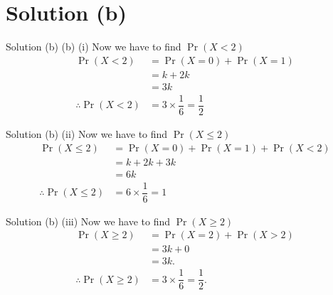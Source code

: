 \documentclass{beamer}
\providecommand{\pr}[1]{\ensuremath{\Pr\left(#1\right)}}
\begin{document}
    \section{Solution (b)}
    \begin{frame}{Solution (b)}
    (b) (i) Now we have to find $\pr{X<2}$\\
    \begin{align*}
    \pr{X<2} &= \pr{X=0} + \pr{X=1}\\
    &= k + 2k\\
    &= 3k\\
    \therefore \pr{X<2} &= 3\times\dfrac{1}{6} = \dfrac{1}{2}
    \end{align*}
    \end{frame}
    \begin{frame}{Solution (b)}
     (ii) Now we have to find $\pr{X \le 2}$\\
    \begin{align*}
    \pr{X \le 2} &= \pr{X=0} + \pr{X=1} + \pr{X<2}\\
    &= k + 2k + 3k\\
    &= 6k\\
    \therefore \pr{X \le 2} &= 6\times\dfrac{1}{6} = 1
    \end{align*}
    \end{frame}
%
\begin{frame}{Solution (b)}
     (iii) Now we have to find $\pr{X \ge 2}$\\
    \begin{align*}
    \pr{X \ge 2} &= \pr{X=2} + \pr{X>2}\\
    &= 3k + 0\\
    &= 3k.\\
   \therefore \pr{X \ge 2} &= 3\times\dfrac{1}{6} = \dfrac{1}{2}.
    \end{align*}
    \end{frame}
\end{document}
